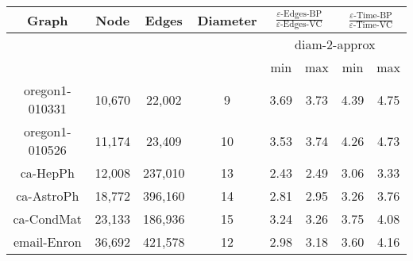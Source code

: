 \begin{table*}[ht]
\centering %
\begin{tabular}{|c c c c |c c |c  c |} %
\hline\hline %
Graph & Node & Edges & Diameter  & \multicolumn{2}{|c|}{$\frac{\varepsilon\mbox{-Edges-BP}}{ \varepsilon\mbox{-Edges-VC}}$} & \multicolumn{2}{c|}{$\frac{\varepsilon\mbox{-Time-BP}}{\varepsilon\mbox{-Time-VC}}$}\\ [0.5ex] %
\hline
&  &  & &\multicolumn{4}{|c|}{diam-2-approx} \\
\hline
&  &  & & min & max & min & max\\
\hline %
oregon1-010331 & 10,670 & 22,002 & 9 & 3.69 & 3.73 & 4.39 & 4.75\\  %
oregon1-010526 & 11,174 & 23,409 & 10 &  3.53 & 3.74 & 4.26 & 4.73 \\
ca-HepPh & 12,008 & 237,010 & 13  & 2.43 & 2.49 & 3.06 & 3.33\\
ca-AstroPh & 18,772 & 396,160  & 14  & 2.81 & 2.95 & 3.26 & 3.76\\
ca-CondMat & 23,133 & 186,936 & 15  & 3.24 & 3.26 & 3.75 & 4.08\\
email-Enron & 36,692 & 421,578 & 12  & 2.98 & 3.18 & 3.60 & 4.16\\[1ex] %
\hline %
\end{tabular}
\caption{\XXX
}
\label{tab:expUndir} %
\end{table*}


